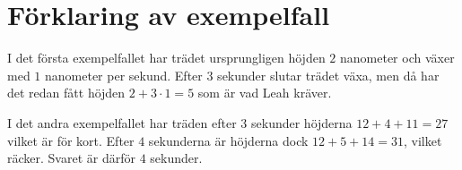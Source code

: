 \section*{Förklaring av exempelfall}
I det första exempelfallet har trädet ursprungligen höjden $2$ nanometer och växer med $1$ nanometer per sekund.
Efter $3$ sekunder slutar trädet växa, men då har det redan fått höjden $2 + 3 \cdot 1 = 5$ som är vad Leah kräver.

I det andra exempelfallet har träden efter $3$ sekunder höjderna $12 + 4 + 11 = 27$ vilket är för kort.
Efter $4$ sekunderna är höjderna dock $12 + 5 + 14 = 31$, vilket räcker.
Svaret är därför $4$ sekunder.
